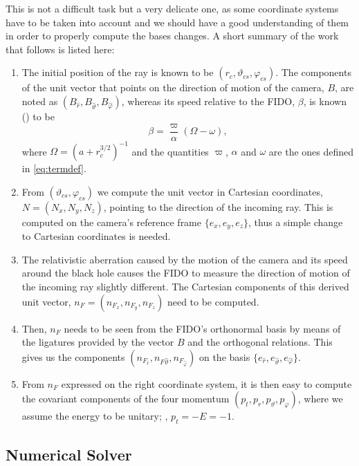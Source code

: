 This is not a difficult task but a very delicate one, as some coordinate systems have to be taken into account and we should have a good understanding of them in order to properly compute the bases changes. A short summary of the work that follows is listed here:
\begin{enumerate}
	\item The initial position of the ray is known to be $(r_c, \vartheta_{cs}, \varphi_{cs})$. The components of the unit vector that points on the direction of motion of the camera, $B$, are noted as $(B_{\widehat{r}}, B_{\widehat{\vartheta}}, B_{\widehat{\varphi}})$, whereas its speed relative to the FIDO, $\beta$, is known (\cite[A.7]{thorne15}) to be
	\[
		\beta = \frac{\varpi}{\alpha}(\Omega - \omega),
	\]
	where $\Omega = \left( a + r_c^{3/2} \right)^{-1}$ and the quantities $\varpi$, $\alpha$ and $\omega$ are the ones defined in \autoref{eq:termdef}.
	\item From $(\vartheta_{cs}, \varphi_{cs})$ we compute the unit vector in Cartesian coordinates, $N = (N_x, N_y, N_z)$, pointing to the direction of the incoming ray. This is computed on the camera's reference frame $\{e_x, e_y, e_z\}$, thus a simple change to Cartesian coordinates is needed.
	\item The relativistic aberration caused by the motion of the camera and its speed around the black hole causes the FIDO to measure the direction of motion of the incoming ray slightly different. The Cartesian components of this derived unit vector, $n_F = (n_{F_x}, n_{F_y}, n_{F_z})$ need to be computed.
	\item Then, $n_F$ needs to be seen from the FIDO's orthonormal basis by means of the ligatures provided by the vector $B$ and the orthogonal relations. This gives us the components $(n_{F_{\widehat{r}}}, n_{F{\widehat{\vartheta}}}, n_{F_{\widehat{\varphi}}})$ on the basis $\{e_{\widehat{r}}, e_{\widehat{\vartheta}}, e_{\widehat{\varphi}}\}$.
	\item From $n_F$ expressed on the right coordinate system, it is then easy to compute the covariant components of the four momentum $(p_t, p_r, p_\vartheta, p_\varphi)$, where we assume the energy to be unitary; \ie, $p_t = -E = -1$.
\end{enumerate}


\subsection{Numerical Solver}

